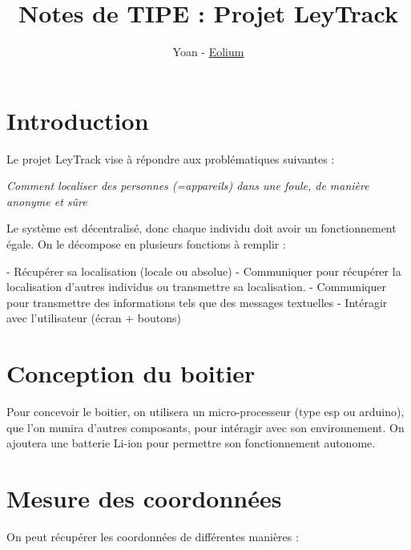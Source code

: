 \documentclass{article}
\title{Notes de TIPE : Projet LeyTrack}
\author{Yoan - \href{https://github.com/eolium}{Eolium}}
\begin{document}
\maketitle

\section*{Introduction}

Le projet LeyTrack vise à répondre aux problématiques suivantes :

\bigskip

\emph{Comment localiser des personnes (=appareils) dans une foule, de manière anonyme et sûre}

\bigskip

Le système est décentralisé, donc chaque individu doit avoir un fonctionnement égale.
On le décompose en plusieurs fonctions à remplir :

- Récupérer sa localisation (locale ou absolue)
- Communiquer pour récupérer la localisation d'autres individus ou transmettre sa localisation.
- Communiquer pour transmettre des informations tels que des messages textuelles
- Intéragir avec l'utilisateur (écran + boutons)


\section{Conception du boitier}

Pour concevoir le boitier, on utilisera un micro-processeur (type esp ou arduino), que l'on munira d'autres composants, pour intéragir avec son environnement. On ajoutera une batterie Li-ion pour permettre son fonctionnement autonome.


\section{Mesure des coordonnées}

On peut récupérer les coordonnées de différentes manières :
\end{document}
